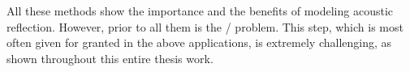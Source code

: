 \mynewline
All these methods show the importance and the benefits of modeling acoustic reflection.
However, prior to all them is the \AERdef/ problem.
This step, which is most often given for granted in the above applications, is extremely challenging, as shown throughout this entire thesis work.










